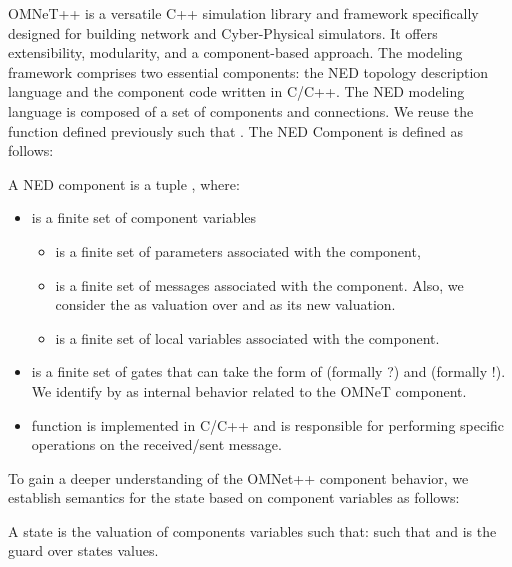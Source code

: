 OMNeT++ \cite{omnet2008} is a versatile C++ simulation library and framework specifically designed for building network and Cyber-Physical simulators. It offers extensibility, modularity, and a component-based approach. The modeling framework comprises two essential components: the NED topology description language and the component code written in C/C++. The NED modeling language is composed of a set of components and connections. We reuse the function  defined previously such that . The NED Component is defined as follows: 

\begin{mydef} \label{def:omnetcomponent} A NED component  is a tuple , where: 
 \begin{itemize}
\item {}  is a finite set of component variables  
 \begin{itemize}
\item  {} is a finite set of parameters associated with the component,
\item {} is a finite set of messages associated with the component. Also, we consider the  as valuation over  and  as its new valuation.
\item {} is a finite set of local variables associated with the component.
\end{itemize}
\item \emath{\Sigma} is a finite set of gates that can take the form of  (formally ?) and  (formally !). We identify by \emath{\tau} as internal behavior related to the OMNeT component.
\item {} function is implemented in C/C++ and is responsible for performing specific operations on the received/sent message.
\end{itemize}
\end{mydef}

To gain a deeper understanding of the OMNet++ component behavior, we establish semantics for the   state based on component variables as follows: 

\begin{mydef} A  state  is the valuation \emath{\theta} of   components variables such that:  such that  and  is the guard over states values.
\end{mydef}

